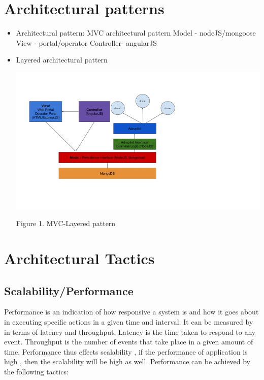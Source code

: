 \documentclass{article}
\begin{document}
	\section{Architectural patterns}%
	
	\begin{itemize}
	
	\item Architectural pattern:
	MVC architectural pattern
	Model - nodeJS/mongoose
	View - portal/operator
	Controller- angularJS
	
	\item Layered architectural pattern
	
	
	 
	
	\includegraphics{images/MVCLayered}
	
	Figure 1. MVC-Layered pattern
	
	\end{itemize}
	
	
	
	
	\section{Architectural Tactics}%
	\subsection{Scalability/Performance }
	Performance is an indication of how responsive a system is and how it goes about in executing specific actions in a given time and interval. It can be measured by in terms of latency and throughput.
	Latency is the time taken to respond to any event. Throughput is the number of events that take place in a given amount of time. Performance thus effects scalability , if the performance of application is high , then the scalability will be high as well. Performance can be achieved by the following tactics:
\end{document}
